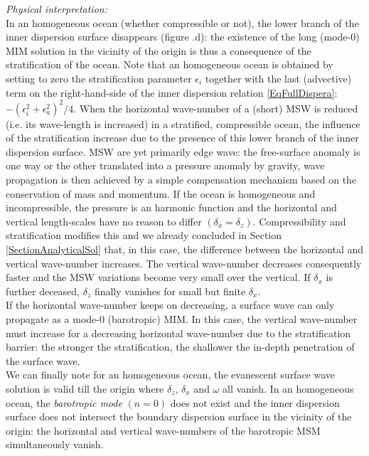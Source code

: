 \documentclass[a4paper,11pt]{article}
\begin{document}
\textit{Physical interpretation:}\\
In an homogeneous ocean (whether compressible or not), the lower branch of the inner dispersion surface disappears (figure .d): the existence of the long (mode-0) MIM solution in the vicinity of the origin is thus a consequence of the stratification of the ocean. Note that an homogeneous ocean is obtained by setting to zero the stratification parameter $\epsilon_i$ together with the last (advective) term on the right-hand-side of the inner dispersion relation \ref{EqFullDispera}: $-(\epsilon_i^2+\epsilon_a^2)^2/4$. When the horizontal wave-number of a (short) MSW is reduced (i.e. its wave-length is increased) in a stratified, compressible ocean, the influence of the stratification increase due to the presence of this lower branch of the inner dispersion surface.  
MSW are yet primarily edge wave: the free-surface anomaly is one way or the other translated into a pressure anomaly by gravity, wave propagation is then achieved by a simple compensation mechanism based on the conservation of mass and momentum. If the ocean is homogeneous and incompressible, the pressure is an harmonic function and the horizontal and vertical length-scales have no reason to differ $(\delta_x=\delta_z)$. Compressibility and stratification modifies this and we already concluded in Section \ref{SectionAnalyticalSol} that, in this case, the difference between the horizontal and vertical wave-number increases. The vertical wave-number decreases consequently faster and the MSW variations become very small over the vertical. If $\delta_x$ is further deceased, $\delta_z$ finally vanishes for small but finite $\delta_x$.\\
If the horizontal wave-number keeps on decreasing, a surface wave can only propagate as a mode-0 (barotropic) MIM. In this case, the vertical wave-number must increase for a decreasing horizontal wave-number due to the stratification barrier: the stronger the stratification, the shallower the in-depth penetration of the surface wave.\\
We can finally note for an homogeneous ocean, the evanescent surface wave solution is valid till the origin where $\delta_z$, $\delta_x$ and $\omega$ all vanish. In an homogeneous ocean, the \textit{barotropic mode} $(n=0)$ does not exist and the inner dispersion surface does not intersect the boundary dispersion surface in the vicinity of the origin: the horizontal and vertical wave-numbers of the barotropic MSM simultaneously vanish. \\
\end{document}
